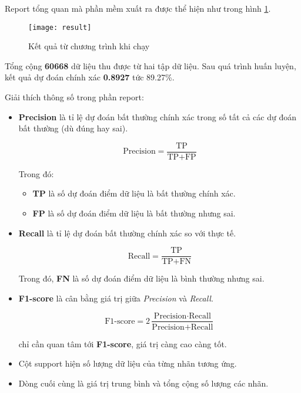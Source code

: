 \documentclass[../main-report.tex]{subfiles}
\begin{document}
Report tổng quan mà phần mềm xuất ra được thể hiện như trong hình \ref{fig:result}.

\begin{figure}[ht!]
\centering\texttt{[image: result]}
\caption{Kết quả từ chương trình khi chạy}
\label{fig:result}
\end{figure}

Tổng cộng \textbf{60668} dữ liệu thu được từ hai tập dữ liệu. Sau quá trình huấn luyện, kết quả dự đoán chính xác \textbf{0.8927} tức 89.27\%.

Giải thích thông số trong phần report:

\begin{itemize}
\item \textbf{Precision} là tỉ lệ dự đoán bất thường chính xác trong số tất cả các dự đoán bất thường (dù đúng hay sai).

\begin{displaymath}
\text{Precision} = \frac{\text{TP}}{\text{TP} + \text{FP}} 
\end{displaymath}

Trong đó:

\begin{itemize}
\item \textbf{TP} là số dự đoán điểm dữ liệu là bất thường chính xác.
\item \textbf{FP} là số dự đoán điểm dữ liệu là bất thường nhưng sai.
\end{itemize}

\item \textbf{Recall} là tỉ lệ dự đoán bất thường chính xác so với thực tế.

\begin{displaymath}
\text{Recall} = \frac{\text{TP}}{\text{TP} + \text{FN}}
\end{displaymath}

Trong đó, \textbf{FN} là số dự đoán điểm dữ liệu là bình thường nhưng sai.

\item \textbf{F1-score} là cân bằng giá trị giữa \emph{Precision} và \emph{Recall}. 

\begin{displaymath}
\text{F1-score} = 2\frac{\text{Precision}\cdot \text{Recall}}{\text{Precision} + \text{Recall}}
\end{displaymath}

chỉ cần quan tâm tới \textbf{F1-score}, giá trị càng cao càng tốt.
\item Cột support hiện số lượng dữ liệu của từng nhãn tương ứng.
\item Dòng cuối cùng là giá  trị trung bình và tổng cộng số lượng các nhãn.
\end{itemize}
\end{document}
